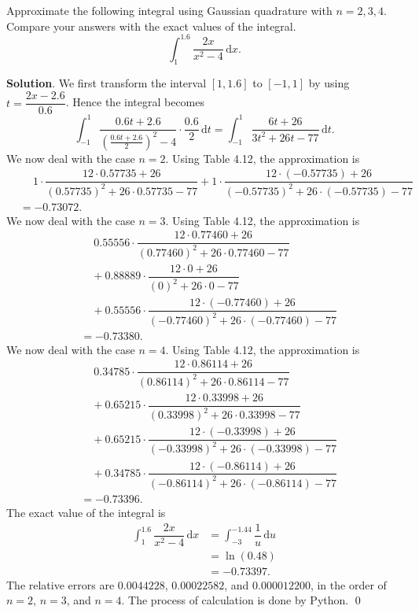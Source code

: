 \documentclass[11pt]{article}
\theoremstyle{break}
\newcommand{\ddi}{\text{$\,$d}}
\numberwithin{equation}{theorem}
\begin{document}
\newpage
\begin{problem}\label{problem 14} %
    Approximate the following integral using Gaussian quadrature with $n=2, 3, 4$. Compare your answers with the exact values of the integral. $$\int_{1}^{1.6}\dfrac{2x}{x^2-4}\ddi x.$$
\end{problem}
\textbf{Solution}. We first transform the interval $[1, 1.6]$ to $[-1, 1]$ by using $t=\dfrac{2x-2.6}{0.6}$. Hence the integral becomes $$\int_{-1}^{1}\dfrac{0.6t+2.6}{\left(\frac{0.6t+2.6}{2}\right)^2-4}\cdot\dfrac{0.6}{2}\ddi t=\int_{-1}^{1}\dfrac{6t+26}{3t^2+26t-77}\ddi t.$$ We now deal with the case $n=2$. Using Table 4.12, the approximation is \begin{align*}
    &\quad\ 1\cdot\dfrac{12\cdot 0.57735+26}{(0.57735)^2+26\cdot0.57735-77}+1\cdot\dfrac{12\cdot (-0.57735)+26}{(-0.57735)^2+26\cdot(-0.57735)-77}\\
    &=-0.73072.
\end{align*} We now deal with the case $n=3$. Using Table 4.12, the approximation is \begin{align*}
    &\quad\ 0.55556\cdot\dfrac{12\cdot 0.77460+26}{(0.77460)^2+26\cdot0.77460-77}\\&\quad+0.88889\cdot\dfrac{12\cdot 0+26}{(0)^2+26\cdot0-77}\\&\quad+0.55556\cdot\dfrac{12\cdot (-0.77460)+26}{(-0.77460)^2+26\cdot(-0.77460)-77}\\
    &=-0.73380.
\end{align*} We now deal with the case $n=4$. Using Table 4.12, the approximation is \begin{align*}
    &\quad\ 0.34785\cdot\dfrac{12\cdot 0.86114+26}{(0.86114)^2+26\cdot0.86114-77}\\&\quad+0.65215\cdot\dfrac{12\cdot 0.33998+26}{(0.33998)^2+26\cdot0.33998-77}\\&\quad+0.65215\cdot\dfrac{12\cdot (-0.33998)+26}{(-0.33998)^2+26\cdot(-0.33998)-77}\\&\quad+0.34785\cdot\dfrac{12\cdot (-0.86114)+26}{(-0.86114)^2+26\cdot(-0.86114)-77}\\
    &=-0.73396.
\end{align*} The exact value of the integral is \begin{align*}
    \int_{1}^{1.6}\dfrac{2x}{x^2-4}\ddi x&=\int_{-3}^{-1.44}\dfrac{1}{u}\ddi u\\
    &=\ln(0.48)\\
    &=-0.73397.
\end{align*} The relative errors are $0.0044228$, $0.00022582$, and $0.000012200$, in the order of $n=2$, $n=3$, and $n=4$. The process of calculation is done by Python. \qed
\end{document}
